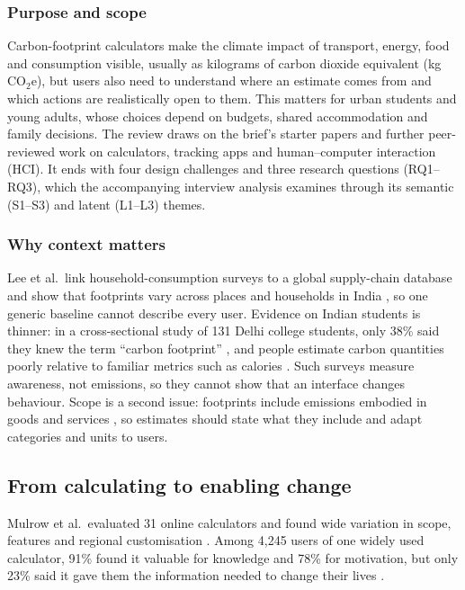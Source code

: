 \documentclass[12pt, a4paper]{article}
\begin{document}
\subsubsection{Purpose and scope}
Carbon-footprint calculators make the climate impact of transport, energy, food and consumption visible, usually as kilograms of carbon dioxide equivalent (kg\,CO$_2$e), but users also need to understand where an estimate comes from and which actions are realistically open to them. This matters for urban students and young adults, whose choices depend on budgets, shared accommodation and family decisions. The review draws on the brief's starter papers and further peer-reviewed work on calculators, tracking apps and human--computer interaction (HCI). It ends with four design challenges and three research questions (RQ1--RQ3), which the accompanying interview analysis examines through its semantic (S1--S3) and latent (L1--L3) themes.

\subsubsection{Why context matters}
Lee et al.\ link household-consumption surveys to a global supply-chain database and show that footprints vary across places and households in India \cite{lee2021}, so one generic baseline cannot describe every user. Evidence on Indian students is thinner: in a cross-sectional study of 131 Delhi college students, only 38\% said they knew the term ``carbon footprint'' \cite{gandhi2025}, and people estimate carbon quantities poorly relative to familiar metrics such as calories \cite{grinstein2018}. Such surveys measure awareness, not emissions, so they cannot show that an interface changes behaviour. Scope is a second issue: footprints include emissions embodied in goods and services \cite{shi2021}, so estimates should state what they include and adapt categories and units to users.

\subsection{From calculating to enabling change}
Mulrow et al.\ evaluated 31 online calculators and found wide variation in scope, features and regional customisation \cite{mulrow2019}. Among 4,245 users of one widely used calculator, 91\% found it valuable for knowledge and 78\% for motivation, but only 23\% said it gave them the information needed to change their lives \cite{collins2020}.
\end{document}
